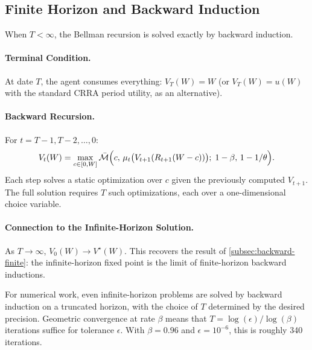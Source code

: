 \subsection{Finite Horizon and Backward Induction}
\label{subsec:dp-finite-horizon}

When $T < \infty$, the Bellman recursion is solved exactly by backward induction.

\paragraph{Terminal Condition.}
At date $T$, the agent consumes everything: $V_T(W) = W$ (or $V_T(W) = u(W)$ with the standard CRRA period utility, as an alternative).

\paragraph{Backward Recursion.}
For $t = T-1, T-2, \ldots, 0$:
\begin{equation}
V_t(W) = \max_{c \in [0, W]} \bar{\mathcal{M}}\Big( c, \, \mu_t\big( V_{t+1}(R_{t+1}(W-c)) \big); \; 1-\beta, \, 1-1/\theta \Big).
\label{eq:backward-induction}
\end{equation}
Each step solves a static optimization over $c$ given the previously computed $V_{t+1}$. The full solution requires $T$ such optimizations, each over a one-dimensional choice variable.

\paragraph{Connection to the Infinite-Horizon Solution.}
As $T \to \infty$, $V_0(W) \to V^\star(W)$. This recovers the result of \cref{subsec:backward-finite}: the infinite-horizon fixed point is the limit of finite-horizon backward inductions.

\begin{calloutnote}
For numerical work, even infinite-horizon problems are solved by backward induction on a truncated horizon, with the choice of $T$ determined by the desired precision. Geometric convergence at rate $\beta$ means that $T = \log(\epsilon)/\log(\beta)$ iterations suffice for tolerance $\epsilon$. With $\beta = 0.96$ and $\epsilon = 10^{-6}$, this is roughly 340 iterations.
\end{calloutnote}

